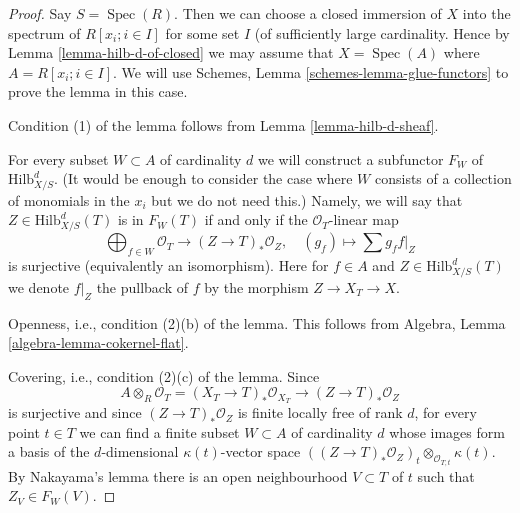 \documentclass[10pt,a4paper]{amsart}
\theoremstyle{plain}
\theoremstyle{definition}
\theoremstyle{remark}
\numberwithin{equation}{subsection}
\def\Spec{\mathop{\mathrm{Spec}}}
\def\Hilbfunctor{\mathrm{Hilb}}
\begin{document}
\begin{proof}
Say $S = \Spec(R)$. Then we can choose a closed immersion of $X$
into the spectrum of $R[x_i; i \in I]$ for some set $I$ (of sufficiently
large cardinality. Hence by Lemma \ref{lemma-hilb-d-of-closed}
we may assume that $X = \Spec(A)$ where $A = R[x_i; i \in I]$.
We will use Schemes, Lemma \ref{schemes-lemma-glue-functors} to prove the
lemma in this case.

\medskip\noindent
Condition (1) of the lemma follows from Lemma \ref{lemma-hilb-d-sheaf}.

\medskip\noindent
For every subset $W \subset A$ of cardinality $d$ we will
construct a subfunctor $F_W$ of $\Hilbfunctor^d_{X/S}$.
(It would be enough to consider the case where $W$ consists of a
collection of monomials in the $x_i$ but we do not need this.)
Namely, we will say that $Z \in \Hilbfunctor^d_{X/S}(T)$ is in $F_W(T)$
if and only if the $\mathcal{O}_T$-linear map
$$
\bigoplus\nolimits_{f \in W} \mathcal{O}_T
\longrightarrow
(Z \to T)_*\mathcal{O}_Z,\quad
(g_f) \longmapsto \sum g_f f|_Z
$$
is surjective (equivalently an isomorphism). Here for $f \in A$
and $Z \in \Hilbfunctor^d_{X/S}(T)$ we denote $f|_Z$ the pullback of $f$
by the morphism $Z \to X_T \to X$.

\medskip\noindent
Openness, i.e., condition (2)(b) of the lemma. This follows from
Algebra, Lemma \ref{algebra-lemma-cokernel-flat}.

\medskip\noindent
Covering, i.e., condition (2)(c) of the lemma. Since
$$
A \otimes_R \mathcal{O}_T =
(X_T \to T)_*\mathcal{O}_{X_T} \to (Z \to T)_*\mathcal{O}_Z
$$
is surjective and since $(Z \to T)_*\mathcal{O}_Z$ is finite locally
free of rank $d$, for every point $t \in T$ we can find a finite
subset $W \subset A$ of cardinality $d$ whose images form a basis
of the $d$-dimensional $\kappa(t)$-vector space
$((Z \to T)_*\mathcal{O}_Z)_t \otimes_{\mathcal{O}_{T, t}} \kappa(t)$.
By Nakayama's lemma there is an open neighbourhood $V \subset T$
of $t$ such that $Z_V \in F_W(V)$.


\end{proof}
\end{document}
